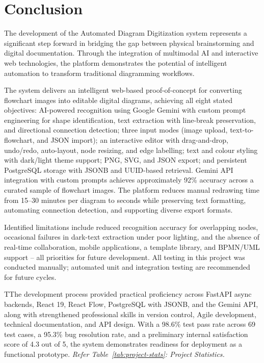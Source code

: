 \chapter*{Conclusion}

The development of the Automated Diagram Digitization system represents a significant step forward in bridging the gap between physical brainstorming and digital documentation. Through the integration of multimodal AI and interactive web technologies, the platform demonstrates the potential of intelligent automation to transform traditional diagramming workflows.
 
The system delivers an intelligent web-based proof-of-concept for converting flowchart images into editable digital diagrams, achieving all eight stated objectives: AI-powered recognition using Google Gemini with custom prompt engineering for shape identification, text extraction with line-break preservation, and directional connection detection; three input modes (image upload, text-to-flowchart, and JSON import); an interactive editor with drag-and-drop, undo/redo, auto-layout, node resizing, and edge labelling; text and colour styling with dark/light theme support; PNG, SVG, and JSON export; and persistent PostgreSQL storage with JSONB and UUID-based retrieval. Gemini API integration with custom prompts achieves approximately 92\% accuracy across a curated sample of flowchart images. The platform reduces manual redrawing time from 15–30 minutes per diagram to seconds while preserving text formatting, automating connection detection, and supporting diverse export formats.
 
Identified limitations include reduced recognition accuracy for overlapping nodes, occasional failures in dark-text extraction under poor lighting, and the absence of real-time collaboration, mobile applications, a template library, and BPMN/UML support -- all priorities for future development. All testing in this project was conducted manually; automated unit and integration testing are recommended for future cycles.

TThe development process provided practical proficiency across FastAPI async backends, React 19, React Flow, PostgreSQL with JSONB, and the Gemini API, along with strengthened professional skills in version control, Agile development, technical documentation, and API design. With a 98.6\% test pass rate across 69 test cases, a 95.3\% bug resolution rate, and a preliminary internal satisfaction score of 4.3 out of 5, the system demonstrates readiness for deployment as a functional prototype. \textit{Refer Table~\ref{tab:project-stats}: Project Statistics.}

